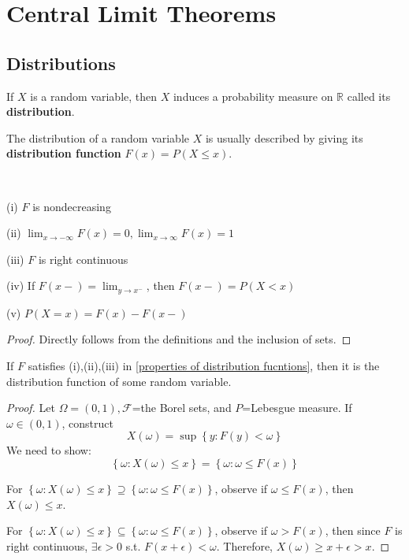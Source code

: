 \chapter{Central Limit Theorems}
\section{Distributions}
\begin{definition}[distribution]
If $X$ is a random variable, then $X$ induces a probability measure on $\mathbb{R}$ called its \textbf{distribution}.
\end{definition}
\begin{remark}
The distribution of a random variable $X$ is usually described by giving its \textbf{distribution function} $F(x)=P(X\le x)$.
\end{remark}
\begin{theorem}\label{properties of distribution fucntions}
\,\par
(i) $F$ is nondecreasing\par
(ii) $\lim_{x\to-\infty}F(x)=0, \lim_{x\to\infty}F(x)=1$\par
(iii) $F$ is right continuous\par
(iv) If $F(x-)=\lim_{y\to x^-}$, then $F(x-)=P(X< x)$\par
(v) $P(X=x)=F(x)-F(x-)$
\end{theorem}
\begin{proof}
Directly follows from the definitions and the inclusion of sets.
\end{proof}
\begin{theorem}\label{r.v. constructed from distribution}
If $F$ satisfies (i),(ii),(iii) in \ref{properties of distribution fucntions}, then it is the distribution function of some random variable.
\end{theorem}
\begin{proof}
Let $\Omega=(0,1),\mathcal{F}$=the Borel sets, and $P$=Lebesgue measure. If $\omega\in(0,1)$, construct \[X(\omega)=\sup\left \{ y:F(y)<\omega \right \} \]
We need to show:\[\left \{ \omega:X(\omega)\le x \right \} =\left \{ \omega:\omega\le F(x) \right \} \]\par
For $\left \{ \omega:X(\omega)\le x \right \} \supseteq\left \{ \omega:\omega\le F(x) \right \}$, observe if $\omega \le F(x)$, then $X(\omega)\le x$.\par
For $\left \{ \omega:X(\omega)\le x \right \} \subseteq\left \{ \omega:\omega\le F(x) \right \}$, observe if $\omega>F(x)$, then since $F$ is right continuous, $\exists \epsilon>0$ s.t. $F(x+\epsilon)<\omega$. Therefore, $X(\omega)\ge x+\epsilon>x$.
\end{proof}


